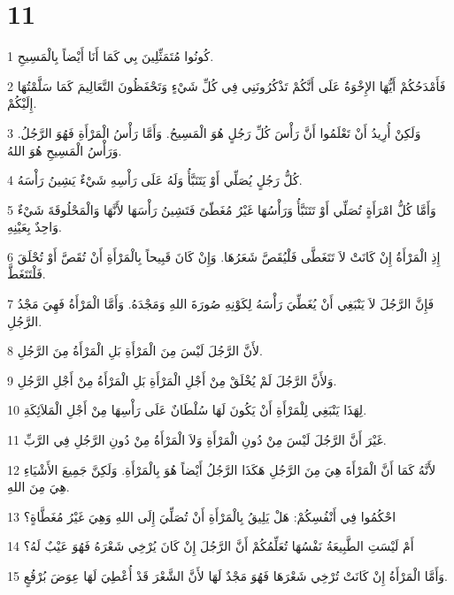 \chapter{11}

\par 1 كُونُوا مُتَمَثِّلِينَ بِي كَمَا أَنَا أَيْضاً بِالْمَسِيحِ.
\par 2 فَأَمْدَحُكُمْ أَيُّهَا الإِخْوَةُ عَلَى أَنَّكُمْ تَذْكُرُونَنِي فِي كُلِّ شَيْءٍ وَتَحْفَظُونَ التَّعَالِيمَ كَمَا سَلَّمْتُهَا إِلَيْكُمْ.
\par 3 وَلَكِنْ أُرِيدُ أَنْ تَعْلَمُوا أَنَّ رَأْسَ كُلِّ رَجُلٍ هُوَ الْمَسِيحُ. وَأَمَّا رَأْسُ الْمَرْأَةِ فَهُوَ الرَّجُلُ. وَرَأْسُ الْمَسِيحِ هُوَ اللهُ.
\par 4 كُلُّ رَجُلٍ يُصَلِّي أَوْ يَتَنَبَّأُ وَلَهُ عَلَى رَأْسِهِ شَيْءٌ يَشِينُ رَأْسَهُ.
\par 5 وَأَمَّا كُلُّ امْرَأَةٍ تُصَلِّي أَوْ تَتَنَبَّأُ وَرَأْسُهَا غَيْرُ مُغَطّىً فَتَشِينُ رَأْسَهَا لأَنَّهَا وَالْمَحْلُوقَةَ شَيْءٌ وَاحِدٌ بِعَيْنِهِ.
\par 6 إِذِ الْمَرْأَةُ إِنْ كَانَتْ لاَ تَتَغَطَّى فَلْيُقَصَّ شَعَرُهَا. وَإِنْ كَانَ قَبِيحاً بِالْمَرْأَةِ أَنْ تُقَصَّ أَوْ تُحْلَقَ فَلْتَتَغَطَّ.
\par 7 فَإِنَّ الرَّجُلَ لاَ يَنْبَغِي أَنْ يُغَطِّيَ رَأْسَهُ لِكَوْنِهِ صُورَةَ اللهِ وَمَجْدَهُ. وَأَمَّا الْمَرْأَةُ فَهِيَ مَجْدُ الرَّجُلِ.
\par 8 لأَنَّ الرَّجُلَ لَيْسَ مِنَ الْمَرْأَةِ بَلِ الْمَرْأَةُ مِنَ الرَّجُلِ.
\par 9 وَلأَنَّ الرَّجُلَ لَمْ يُخْلَقْ مِنْ أَجْلِ الْمَرْأَةِ بَلِ الْمَرْأَةُ مِنْ أَجْلِ الرَّجُلِ.
\par 10 لِهَذَا يَنْبَغِي لِلْمَرْأَةِ أَنْ يَكُونَ لَهَا سُلْطَانٌ عَلَى رَأْسِهَا مِنْ أَجْلِ الْمَلاَئِكَةِ.
\par 11 غَيْرَ أَنَّ الرَّجُلَ لَيْسَ مِنْ دُونِ الْمَرْأَةِ وَلاَ الْمَرْأَةُ مِنْ دُونِ الرَّجُلِ فِي الرَّبِّ.
\par 12 لأَنَّهُ كَمَا أَنَّ الْمَرْأَةَ هِيَ مِنَ الرَّجُلِ هَكَذَا الرَّجُلُ أَيْضاً هُوَ بِالْمَرْأَةِ. وَلَكِنَّ جَمِيعَ الأَشْيَاءِ هِيَ مِنَ اللهِ.
\par 13 احْكُمُوا فِي أَنْفُسِكُمْ: هَلْ يَلِيقُ بِالْمَرْأَةِ أَنْ تُصَلِّيَ إِلَى اللهِ وَهِيَ غَيْرُ مُغَطَّاةٍ؟
\par 14 أَمْ لَيْسَتِ الطَّبِيعَةُ نَفْسُهَا تُعَلِّمُكُمْ أَنَّ الرَّجُلَ إِنْ كَانَ يُرْخِي شَعْرَهُ فَهُوَ عَيْبٌ لَهُ؟
\par 15 وَأَمَّا الْمَرْأَةُ إِنْ كَانَتْ تُرْخِي شَعْرَهَا فَهُوَ مَجْدٌ لَهَا لأَنَّ الشَّعْرَ قَدْ أُعْطِيَ لَهَا عِوَضَ بُرْقُعٍ.
